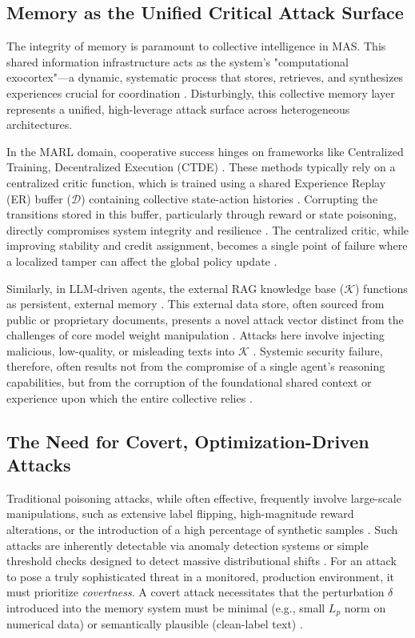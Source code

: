 \documentclass[conference]{IEEEtran}
\begin{document}
\subsection{Memory as the Unified Critical Attack Surface}
The integrity of memory is paramount to collective intelligence in MAS. This shared information infrastructure acts as the system's "computational exocortex"—a dynamic, systematic process that stores, retrieves, and synthesizes experiences crucial for coordination \cite{Ref1}. Disturbingly, this collective memory layer represents a unified, high-leverage attack surface across heterogeneous architectures.

In the MARL domain, cooperative success hinges on frameworks like Centralized Training, Decentralized Execution (CTDE) \cite{Ref6, Ref10}. These methods typically rely on a centralized critic function, which is trained using a shared Experience Replay (ER) buffer ($\mathcal{D}$) containing collective state-action histories \cite{Ref11}. Corrupting the transitions stored in this buffer, particularly through reward or state poisoning, directly compromises system integrity and resilience \cite{Ref12, Ref13}. The centralized critic, while improving stability and credit assignment, becomes a single point of failure where a localized tamper can affect the global policy update \cite{Ref6}.

Similarly, in LLM-driven agents, the external RAG knowledge base ($\mathcal{K}$) functions as persistent, external memory \cite{Ref2}. This external data store, often sourced from public or proprietary documents, presents a novel attack vector distinct from the challenges of core model weight manipulation \cite{Ref14, Ref15}. Attacks here involve injecting malicious, low-quality, or misleading texts into $\mathcal{K}$ \cite{Ref7, Ref16}. Systemic security failure, therefore, often results not from the compromise of a single agent's reasoning capabilities, but from the corruption of the foundational shared context or experience upon which the entire collective relies \cite{Ref1}.

\subsection{The Need for Covert, Optimization-Driven Attacks}
Traditional poisoning attacks, while often effective, frequently involve large-scale manipulations, such as extensive label flipping, high-magnitude reward alterations, or the introduction of a high percentage of synthetic samples \cite{Ref12, Ref17}. Such attacks are inherently detectable via anomaly detection systems or simple threshold checks designed to detect massive distributional shifts \cite{Ref18}. For an attack to pose a truly sophisticated threat in a monitored, production environment, it must prioritize \textit{covertness}. A covert attack necessitates that the perturbation $\delta$ introduced into the memory system must be minimal (e.g., small $L_p$ norm on numerical data) or semantically plausible (clean-label text) \cite{Ref19, Ref20}.
\end{document}
